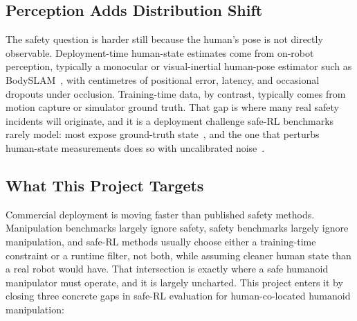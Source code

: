 \documentclass[11pt,a4paper]{report}
\newcommand{\bodyslampp}{BodySLAM\nolinebreak[4]\hspace{-.05em}\raisebox{.2ex}{\scriptsize ++}}
\begin{document}
\subsection{Perception Adds Distribution Shift}
\label{sec:intro:mot:perception}

The safety question is harder still because the human's pose is not
directly observable. Deployment-time human-state estimates come from
on-robot perception, typically a monocular or visual-inertial
human-pose estimator such as
\bodyslampp{}~\cite{henning2023bodyslampp}, with centimetres of
positional error, latency, and occasional dropouts under occlusion.
Training-time data, by contrast, typically comes from motion capture
or simulator ground truth. That gap is where many real safety
incidents will originate, and it is a deployment challenge safe-RL
benchmarks rarely model: most expose ground-truth
state~\cite{ray2019safetygym,ji2023safetygymnasium,yuan2022safecontrolgym},
and the one that perturbs human-state measurements does so with
uncalibrated noise~\cite{thumm2024humanrobotgym}.

\subsection{What This Project Targets}
\label{sec:intro:mot:targets}

Commercial deployment is moving faster than published safety
methods. Manipulation benchmarks largely ignore safety, safety
benchmarks largely ignore manipulation, and safe-RL methods usually
choose either a training-time constraint or a runtime filter, not
both, while assuming cleaner human state than a real robot would
have. That intersection is exactly where a safe humanoid manipulator
must operate, and it is largely uncharted. This project enters it by
closing three concrete gaps in safe-RL evaluation for human-co-located
humanoid manipulation:
\end{document}
